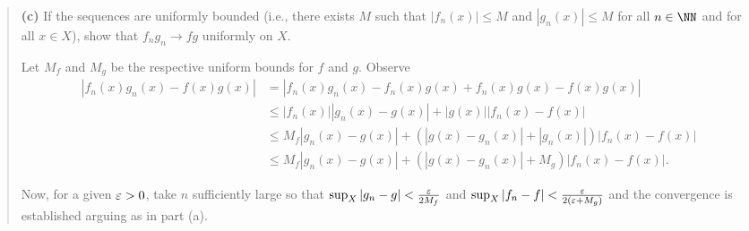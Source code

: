 \documentclass{homework}
\begin{document}
\begin{quote}
  {\bf (c)} If the sequences are uniformly bounded (i.e., there exists $M$ such that $|f_n(x)| \le M$ and $|g_n(x)| \le M$ for all $n\in \NN$ and for all $x\in X$), show that $f_ng_n \to fg$ uniformly on $X$.
  \begin{solution}
     Let $M_f$ and $M_g$ be the respective uniform bounds for $f$ and $g$. Observe
     \begin{align*}
      |f_n(x)g_n(x) - f(x)g(x)| 
      &= |f_n(x)g_n(x) - f_n(x)g(x) + f_n(x)g(x) - f(x)g(x)|\\
      &\le |f_n(x)| |g_n(x) - g(x)| + |g(x)| |f_n(x) - f(x)|\\
      &\le M_f |g_n(x) - g(x)| + (|g(x) - g_n(x)| + |g_n(x)|) |f_n(x) - f(x)|\\
      &\le M_f |g_n(x) - g(x)| + (|g(x) - g_n(x)| + M_g) |f_n(x) - f(x)|.
     \end{align*}
  \end{solution}
  Now, for a given $\varepsilon>0$, take $n$ sufficiently large so that $\sup_X|g_n -g| <\frac{\varepsilon}{2M_f}$ and $\sup_X|f_n - f|< \frac {\varepsilon}{2(\varepsilon + M_g)}$ and the convergence is established arguing as in part (a).
\end{quote}
\end{document}
